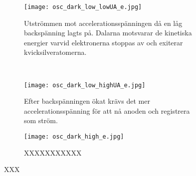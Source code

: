 \begin{figure}[h]
	\centering
	\begin{subfigure}[c]{0.47\textwidth}
	\texttt{[image: osc\_dark\_low\_lowUA\_e.jpg]}
	\caption{Utströmmen mot accelerationsspänningen då en låg backspänning lagts på. Dalarna motsvarar de kinetiska energier varvid elektronerna stoppas av och exiterar kvicksilveratomerna.}
	\label{fig:dark_lowub}
	\end{subfigure}
	~
	\begin{subfigure}[c]{0.49\textwidth}
	\texttt{[image: osc\_dark\_low\_highUA\_e.jpg]}
	\caption{Efter backspänningen ökat krävs det mer accelerationsspänning för att nå anoden och registrera som ström.}
	\label{fig:dark_highub}
	\end{subfigure}
	
	\begin{subfigure}[c]{0.47\textwidth}
	\texttt{[image: osc\_dark\_high\_e.jpg]}
	\caption{XXXXXXXXXXX}
	\label{fig:dark_high}
	\end{subfigure}
	\caption{XXX}\label{fig:hgstuff}
\end{figure}

